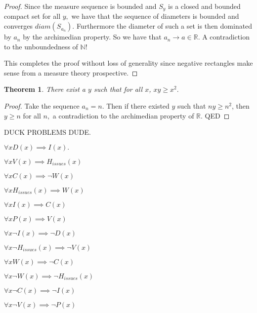 \documentclass[letter]{article}
\newtheorem{theorem}{Theorem}
\newenvironment{menumerate}{%
  \edef\backupindent{\the\parindent}%
  \enumerate%
  \setlength{\parindent}{\backupindent}%
}{\endenumerate}
\begin{document}
\begin{menumerate}
\begin{menumerate}
\begin{proof}
          Since the measure sequence is bounded and $S_y$ is a closed and bounded compact set
          for all $y,$ we have that the sequence of diameters is bounded and converges $diam(S_{a_n})$.
          Furthermore the diameter of such a set is then dominated by $a_n$ by the archimedian property.
          So we have that $a_n \to a \in \mathbb{R}.$ A contradiction  to the unboundedness of $\mathbb{N}!$

          This completes the proof without loss of generality since negative rectangles make sense from
          a measure theory prospective. 
        \end{proof}
        \item 
        \begin{theorem}
          There exist a $y$ such that for all $x$, $xy \geq x^2.$
        \end{theorem}
        \begin{proof}
          Take the sequence $a_n = n.$ Then if there existed $y$ such that $ny \geq n^2$, then $y \geq n$ for all $n,$
          a contradiction to the archimedian property of $\mathbb{R}.$ QED
        \end{proof}

        \item DUCK PROBLEMS DUDE.
        \begin{menumerate}
          \item
            \begin{menumerate}
             \item $\forall x D(x) \implies  I(x).$
             \item $\forall x V(x) \implies H_{issues}(x)$
             \item $\forall x C(x) \implies \neg W(x)$
             \item $\forall x H_{issues}(x) \implies W(x)$
             \item $\forall x  I(x) \implies C(x)$
             \item $\forall x P(x) \implies V(x) $
            \end{menumerate}
          \item 
            \begin{menumerate}
             \item $\forall x  \neg I(x) \implies \neg D(x)$
             \item $\forall x \neg H_{issues}(x) \implies \neg V(x)$
             \item $\forall x  W(x) \implies \neg C(x)$
             \item $\forall x \neg W(x) \implies \neg H_{issues}(x) $
             \item $\forall x \neg C(x) \implies \neg I(x)$
             \item $\forall x \neg V(x) \implies \neg P(x) $
            \end{menumerate}
        \end{menumerate}
    \end{menumerate}
\end{menumerate}
\end{document}
